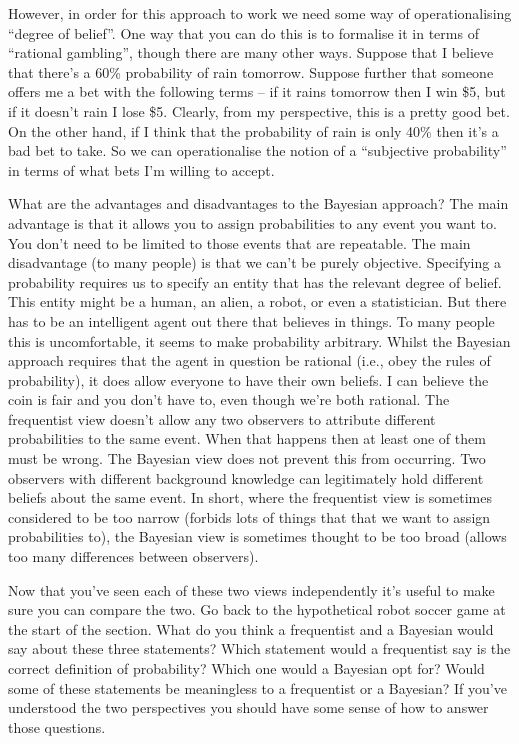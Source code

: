 However, in order for this approach to work we need some way of operationalising ``degree of belief''. One way that you can do this is to formalise it in terms of ``rational gambling'', though there are many other ways. Suppose that I believe that there's a 60\% probability of rain tomorrow. Suppose further that someone offers me a bet with the following terms -- if it rains tomorrow then I win \$5, but if it doesn't rain I lose \$5. Clearly, from my perspective, this is a pretty good bet. On the other hand, if I think that the probability of rain is only 40\% then it's a bad bet to take. So we can operationalise the notion of a ``subjective probability'' in terms of what bets I'm willing to accept. 

What are the advantages and disadvantages to the Bayesian approach? The main advantage is that it allows you to assign probabilities to any event you want to. You don't need to be limited to those events that are repeatable. The main disadvantage (to many people) is that we can't be purely objective. Specifying a probability requires us to specify an entity that has the relevant degree of belief. This entity might be a human, an alien, a robot, or even a statistician. But there has to be an intelligent agent out there that believes in things. To many people this is uncomfortable, it seems to make probability arbitrary. Whilst the Bayesian approach requires that the agent in question be rational (i.e., obey the rules of probability), it does allow everyone to have their own beliefs. I can believe the coin is fair and you don't have to, even though we're both rational. The frequentist view doesn't allow any two observers to attribute different probabilities to the same event. When that happens then at least one of them must be wrong. The Bayesian view does not prevent this from occurring. Two observers with different background knowledge can legitimately hold different beliefs about the same event. In short, where the frequentist view is sometimes considered to be too narrow (forbids lots of things that that we want to assign probabilities to), the Bayesian view is sometimes thought to be too broad (allows too many differences between observers). 


Now that you've seen each of these two views independently it's useful to make sure you can compare the two. Go back to the hypothetical robot soccer game at the start of the section. What do you think a frequentist and a Bayesian would say about these three statements? Which statement would a frequentist say is the correct definition of probability? Which one would a Bayesian opt for? Would some of these statements be meaningless to a frequentist or a Bayesian? If you've understood the two perspectives you should have some sense of how to answer those questions.

